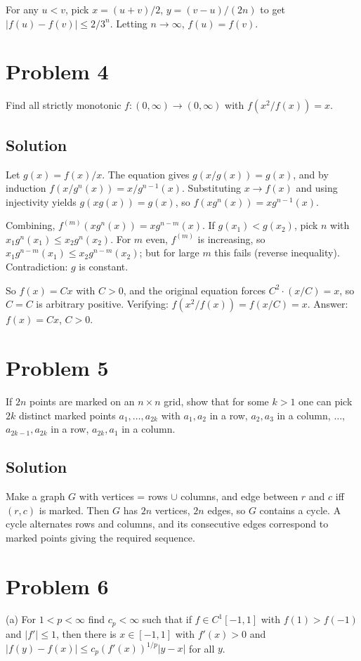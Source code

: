 \documentclass{article}
\begin{document}
For any $u<v$, pick $x=(u+v)/2$, $y=(v-u)/(2n)$ to get $|f(u)-f(v)|\le 2/3^n$. Letting $n\to\infty$, $f(u)=f(v)$.

\section*{Problem 4}
Find all strictly monotonic $f:(0,\infty)\to(0,\infty)$ with $f(x^2/f(x)) = x$.

\subsection*{Solution}
Let $g(x)=f(x)/x$. The equation gives $g(x/g(x)) = g(x)$, and by induction $f(x/g^n(x)) = x/g^{n-1}(x)$. Substituting $x\to f(x)$ and using injectivity yields $g(xg(x))=g(x)$, so $f(xg^n(x))=xg^{n-1}(x)$.

Combining, $f^{(m)}(xg^n(x)) = xg^{n-m}(x)$. If $g(x_1)<g(x_2)$, pick $n$ with $x_1 g^n(x_1)\le x_2 g^n(x_2)$. For $m$ even, $f^{(m)}$ is increasing, so $x_1 g^{n-m}(x_1)\le x_2 g^{n-m}(x_2)$; but for large $m$ this fails (reverse inequality). Contradiction: $g$ is constant.

So $f(x) = Cx$ with $C>0$, and the original equation forces $C^2 \cdot (x/C) = x$, so $C = C$ is arbitrary positive. Verifying: $f(x^2/f(x)) = f(x/C) = x$. Answer: $f(x)=Cx$, $C>0$.

\section*{Problem 5}
If $2n$ points are marked on an $n\times n$ grid, show that for some $k>1$ one can pick $2k$ distinct marked points $a_1,\dots,a_{2k}$ with $a_1,a_2$ in a row, $a_2,a_3$ in a column, $\dots$, $a_{2k-1},a_{2k}$ in a row, $a_{2k},a_1$ in a column.

\subsection*{Solution}
Make a graph $G$ with vertices = rows $\cup$ columns, and edge between $r$ and $c$ iff $(r,c)$ is marked. Then $G$ has $2n$ vertices, $2n$ edges, so $G$ contains a cycle. A cycle alternates rows and columns, and its consecutive edges correspond to marked points giving the required sequence.

\section*{Problem 6}
(a) For $1<p<\infty$ find $c_p<\infty$ such that if $f\in C^1[-1,1]$ with $f(1)>f(-1)$ and $|f'|\le 1$, then there is $x\in[-1,1]$ with $f'(x)>0$ and $|f(y)-f(x)|\le c_p (f'(x))^{1/p}|y-x|$ for all $y$.
\end{document}
